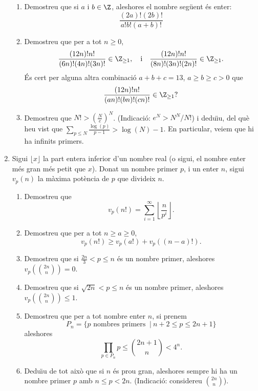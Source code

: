 \begin{enumerate}[leftmargin=*]
\begin{enumerate}
\item   Demostreu que si $a$ i $b\in\Z$, aleshores el nombre
seg\"{u}ent és enter: $$ \frac{(2a)!(2b)!}{a!b!(a+b)!}$$

\item Demostreu que per a tot $n\ge 0$,
  \[
    \frac {(12n)!n!}{(6n)!(4n)!(3n)!}\in\Z_{\ge 1}, \quad\text{i}\quad    \frac {(12n)!n!}{(8n)!(3n)!(2n)!}\in\Z_{\ge 1}.
  \]
  És cert per alguna altra combinació $a+b+c=13$, $a\ge b\ge c>0$ que
  \[
    \frac {(12n)!n!}{(an)!(bn)!(cn)!}\in\Z_{\ge 1}?
  \]

\item  Demostreu que $N!>\left( \frac {N}{e}\right)^N$.
  (Indicació: $e^N>N^N/N!$) i dedu\"{\i}u, del què heu vist que $\sum_{p\le
N} \frac{\log(p)}{p-1} > \log(N)-1$. En particular, veiem que hi ha infinits primers.
\end{enumerate}


\item Sigui $\lfloor x \rfloor$ la part entera inferior d'un
nombre real (o sigui, el nombre enter més gran més petit que $x$).
Donat un nombre primer $p$, i un enter $n$, sigui $v_p(n)$ la màxima
potència de $p$ que divideix $n$.

\begin{enumerate}


\item  Demostreu que $$v_p(n!)=\sum_{i=1}^{\infty} \left\lfloor
\frac n{p^i}\right\rfloor.$$

\item  Demostreu que per a tot $n\ge a\ge 0$,  $$v_p(n!)\ge
v_p(a!)+v_p((n-a)!).$$

\item  Demostreu que si  $\frac{2n}3< p\le n$ és un nombre
primer, aleshores $v_p(\binom{2n}{n})=0$.

\item  Demostreu que si  $\sqrt{2n}< p\le n$ és un nombre
primer, aleshores $v_p(\binom{2n}{n})\le 1$.

\item  Demostreu que per a tot nombre enter $n$, si prenem
\[
P_n=\{p \mbox{ nombres primers } \ | \ n+2\le p \le 2n+1\}
\]
aleshores
\[
\prod_{p\in P_n} p \le \binom{2n+1}{n}< 4^n.
\]

\item  Dedu\"{\i}u de tot això que si $n$ és prou gran,
aleshores sempre hi ha un nombre primer $p$ amb $n\le p<2n$.
(Indicació: considereu $\binom{2n}{n}$).

\end{enumerate}



\end{enumerate}
